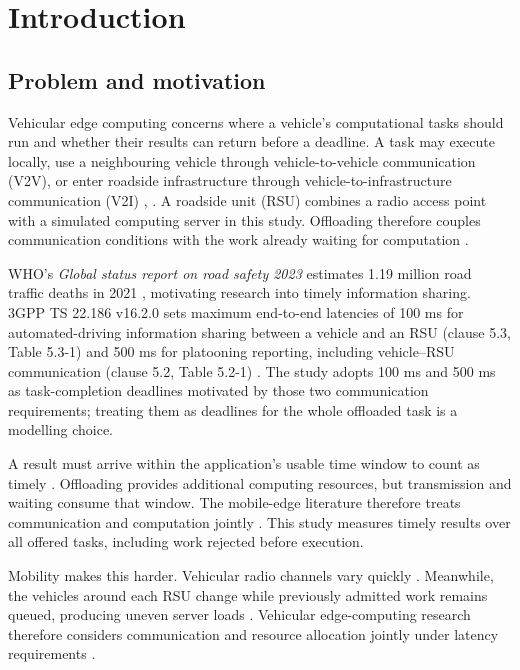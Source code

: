 \documentclass[12pt,a4paper]{article}
\begin{document}
\section{Introduction}\label{sec:1}

\FloatBarrier
\subsection{Problem and motivation}\label{sec:1.1}

Vehicular edge computing concerns where a vehicle's computational tasks should run and whether their results can return before a deadline. A task may execute locally, use a neighbouring vehicle through vehicle-to-vehicle communication (V2V), or enter roadside infrastructure through vehicle-to-infrastructure communication (V2I) \cite{ref1}, \cite{ref2}. A roadside unit (RSU) combines a radio access point with a simulated computing server in this study. Offloading therefore couples communication conditions with the work already waiting for computation \cite{ref3}.

WHO's \emph{Global status report on road safety 2023} estimates 1.19 million road traffic deaths in 2021 \cite{ref43}, motivating research into timely information sharing. 3GPP TS 22.186 v16.2.0 sets maximum end-to-end latencies of 100 ms for automated-driving information sharing between a vehicle and an RSU (clause 5.3, Table 5.3-1) and 500 ms for platooning reporting, including vehicle--RSU communication (clause 5.2, Table 5.2-1) \cite{ref42}. The study adopts 100 ms and 500 ms as task-completion deadlines motivated by those two communication requirements; treating them as deadlines for the whole offloaded task is a modelling choice.

A result must arrive within the application's usable time window to count as timely \cite{ref4}. Offloading provides additional computing resources, but transmission and waiting consume that window. The mobile-edge literature therefore treats communication and computation jointly \cite{ref3}. This study measures timely results over all offered tasks, including work rejected before execution.

Mobility makes this harder. Vehicular radio channels vary quickly \cite{ref5}. Meanwhile, the vehicles around each RSU change while previously admitted work remains queued, producing uneven server loads \cite{ref7}. Vehicular edge-computing research therefore considers communication and resource allocation jointly under latency requirements \cite{ref6}.
\end{document}
